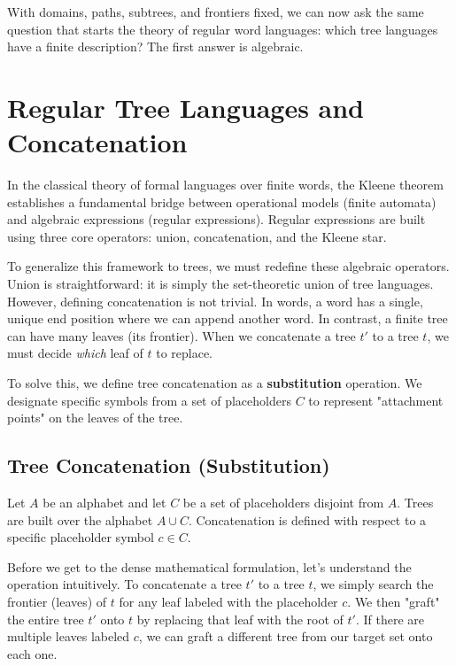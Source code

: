 With domains, paths, subtrees, and frontiers fixed, we can now ask the same question that starts the theory of regular word languages: which tree languages have a finite description? The first answer is algebraic.

\section{Regular Tree Languages and Concatenation}
\label{sec:regular-tree-languages}

In the classical theory of formal languages over finite words, the Kleene theorem establishes a fundamental bridge between operational models (finite automata) and algebraic expressions (regular expressions). Regular expressions are built using three core operators: union, concatenation, and the Kleene star.

To generalize this framework to trees, we must redefine these algebraic operators. Union is straightforward: it is simply the set-theoretic union of tree languages. However, defining concatenation is not trivial. In words, a word has a single, unique end position where we can append another word. In contrast, a finite tree can have many leaves (its frontier). When we concatenate a tree $t'$ to a tree $t$, we must decide \emph{which} leaf of $t$ to replace.

To solve this, we define tree concatenation as a \textbf{substitution} operation. We designate specific symbols from a set of placeholders $C$ to represent "attachment points" on the leaves of the tree.

\subsection{Tree Concatenation (Substitution)}
Let $A$ be an alphabet and let $C$ be a set of placeholders disjoint from $A$. Trees are built over the alphabet $A \cup C$. Concatenation is defined with respect to a specific placeholder symbol $c \in C$.

Before we get to the dense mathematical formulation, let's understand the operation intuitively. To concatenate a tree $t'$ to a tree $t$, we simply search the frontier (leaves) of $t$ for any leaf labeled with the placeholder $c$. We then "graft" the entire tree $t'$ onto $t$ by replacing that leaf with the root of $t'$. If there are multiple leaves labeled $c$, we can graft a different tree from our target set onto each one.


